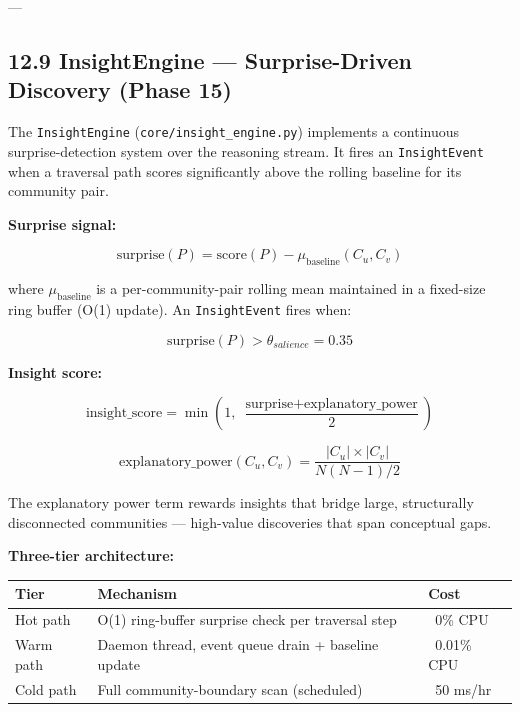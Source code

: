 \documentclass[10pt,journal,compsoc]{IEEEtran}
\begin{document}
---

\subsection{12.9 InsightEngine — Surprise-Driven Discovery (Phase 15)}

The \texttt{InsightEngine} (\texttt{core/insight\_engine.py}) implements a continuous surprise-detection system over the reasoning stream. It fires an \texttt{InsightEvent} when a traversal path scores signi\-ficantly above the rolling baseline for its community pair.

\textbf{Surprise signal:}

\begin{equation}
\text{surprise}(P) = \text{score}(P) - \mu_{\text{baseline}}(C_u, C_v)
\end{equation}

where $\mu_{\text{baseline}}$ is a per-community-pair rolling mean maintained in a fixed-size ring buffer (O(1) update). An \texttt{InsightEvent} fires when:

\begin{equation}
\text{surprise}(P) > \theta_{salience} = 0.35
\end{equation}

\textbf{Insight score:}

\begin{equation}
\text{insight\_score} = \min\!\left(1,\; \frac{\text{surprise} + \text{explanatory\_power}}{2}\right)
\end{equation}

\begin{equation}
\text{explanatory\_power}(C_u, C_v) = \frac{|C_u| \times |C_v|}{N(N-1)/2}
\end{equation}

The explanatory power term rewards insights that bridge large, struc\-turally disco\-nnected communities — high-value discoveries that span conceptual gaps.

\textbf{Three-tier archi\-tecture:}

\begin{center}
{\footnotesize
\begin{tabularx}{\columnwidth}{|>{\raggedright\arraybackslash}X|>{\raggedright\arraybackslash}X|>{\raggedright\arraybackslash}X|}
\hline
Tier & Mechanism & Cost \\ \hline
Hot path & O(1) ring-buffer surprise check per traversal step & ~0\% CPU \\ \hline
Warm path & Daemon thread, event queue drain + baseline update & ~0.01\% CPU \\ \hline
Cold path & Full community-boundary scan (scheduled) & ~50 ms/hr \\ \hline
\end{tabularx}
}
\end{center}
\end{document}

